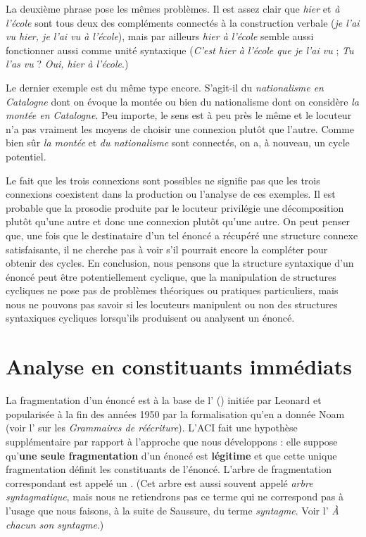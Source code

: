 {La deuxième phrase pose les mêmes problèmes. Il est assez clair que \textit{hier} et \textit{à l’école} sont tous deux des compléments connectés à la construction verbale (\textit{je l’ai vu hier, je l’ai vu à l’école}), mais par ailleurs \textit{hier à l’école} semble aussi fonctionner aussi comme unité syntaxique (\textit{C’est hier à l’école que je l’ai vu} ; \textit{Tu l’as vu} ? \textit{Oui, hier à l’école}.)

Le dernier exemple est du même type encore. S’agit-il du \textit{nationalisme en Catalogne} dont on évoque la montée ou bien du nationalisme dont on considère \textit{la montée en Catalogne}. Peu importe, le sens est à peu près le même et le locuteur n’a pas vraiment les moyens de choisir une connexion plutôt que l’autre. Comme bien sûr \textit{la montée} et \textit{du nationalisme} sont connectés, on a, à nouveau, un cycle potentiel.

Le fait que les trois connexions sont possibles ne signifie pas que les trois connexions coexistent dans la production ou l’analyse de ces exemples. Il est probable que la prosodie produite par le locuteur privilégie une décomposition plutôt qu’une autre et donc une connexion plutôt qu’une autre. On peut penser que, une fois que le destinataire d’un tel énoncé a récupéré une structure connexe satisfaisante, il ne cherche pas à voir s’il pourrait encore la compléter pour obtenir des cycles. En conclusion, nous pensons que la structure syntaxique d’un énoncé peut être potentiellement cyclique, que la manipulation de structures cycliques ne pose pas de problèmes théoriques ou pratiques particuliers, mais nous ne pouvons pas savoir si les locuteurs manipulent ou non des structures syntaxiques cycliques lorsqu’ils produisent ou analysent un énoncé.
}
\section{Analyse en constituants immédiats}\label{sec:3.2.25}

La fragmentation d’un énoncé est à la base de l’ () initiée par Leonard \citet{bloomfield1933language} et popularisée à la fin des années 1950 par la formalisation qu’en a donnée Noam \citet{chomsky1957syntactic} (voir l’ sur les \textit{Grammaires de réécriture}). L’ACI fait une hypothèse supplémentaire par rapport à l’approche que nous développons : elle suppose qu’\textbf{une seule fragmentation} d’un énoncé est \textbf{légitime} et que cette unique fragmentation définit les constituants de l’énoncé. L’arbre de fragmentation correspondant est appelé un . (Cet arbre est aussi souvent appelé \textit{arbre syntagmatique}, mais nous ne retiendrons pas ce terme qui ne correspond pas à l’usage que nous faisons, à la suite de Saussure, du terme \textit{syntagme}. Voir l’ \textit{À chacun son syntagme}.)

